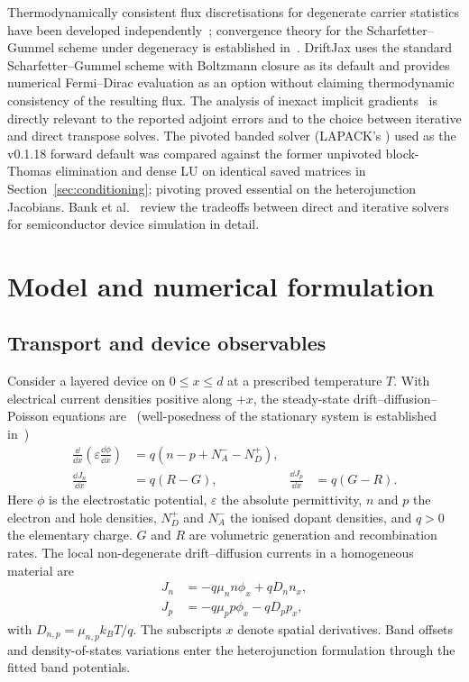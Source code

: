 Thermodynamically consistent flux discretisations for degenerate
carrier statistics have been developed independently~\cite{farrell2021};
convergence theory for the Scharfetter--Gummel scheme under
degeneracy is established in~\cite{brezzi1989}.
DriftJax uses the standard Scharfetter--Gummel scheme with Boltzmann
closure as its default and provides numerical Fermi--Dirac evaluation as
an option without claiming thermodynamic consistency of the resulting
flux. The analysis of inexact implicit gradients~\cite{ehrhardt2024}
is directly relevant to the reported adjoint errors and to the choice
between iterative and direct transpose solves. The pivoted banded solver
(LAPACK's ) used as the v0.1.18 forward default was compared
against the former unpivoted block-Thomas elimination and dense LU on
identical saved matrices in Section~\ref{sec:conditioning}; pivoting
proved essential on the heterojunction Jacobians. Bank et al.~\cite{bank1983}
review the tradeoffs between direct and iterative solvers for
semiconductor device simulation in detail.

\section{Model and numerical formulation}\label{sec:model}
\subsection{Transport and device observables}
Consider a layered device on $0\leq x\leq d$ at a prescribed temperature
$T$. With electrical current densities positive along $+x$, the
steady-state drift--diffusion--Poisson equations are~\cite{selberherr1984,gaury2019,mann2022partial}
(well-posedness of the stationary system is established
in~\cite{markowich1986})
\begin{align}
\frac{\dd}{\dd x}\left(\varepsilon\frac{\dd\phi}{\dd x}\right)
 &=q(n-p+N_A^- -N_D^+),\label{eq:poisson}\\
\frac{\dd J_n}{\dd x}&=q(R-G),&
\frac{\dd J_p}{\dd x}&=q(G-R).\label{eq:continuity}
\end{align}
Here $\phi$ is the electrostatic potential, $\varepsilon$ the absolute
permittivity, $n$ and $p$ the electron and hole densities, $N_D^+$ and
$N_A^-$ the ionised dopant densities, and $q>0$ the elementary charge.
$G$ and $R$ are volumetric generation and recombination rates.
The local non-degenerate drift--diffusion currents in a homogeneous
material are~\cite{gaury2019}
\begin{align}
J_n&=-q\mu_n n\phi_x+qD_n n_x,\\
J_p&=-q\mu_p p\phi_x-qD_p p_x,
\end{align}
with $D_{n,p}=\mu_{n,p}k_BT/q$. The subscripts $x$ denote spatial
derivatives. Band offsets and density-of-states variations enter the
heterojunction formulation through the fitted band potentials.

